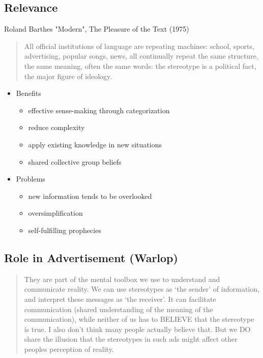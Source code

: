 \documentclass[12pt]{article}
\begin{document}
\subsection{Relevance}

Roland Barthes "Modern", The Pleasure of the Text (1975)

\begin{quotation} 
 All official institutions of language are repeating machines: school, sports, advertising, popular songs, news, all continually repeat the same structure, the same meaning, often the same words: the stereotype is a political fact, the major figure of ideology.\\
\end{quotation}

\begin{itemize}
\item Benefits
 \begin{itemize}
  \item effective sense-making through categorization
  \item reduce complexity
  \item apply existing knowledge in new situations
  \item shared collective group beliefs
 \end{itemize}
\item Problems
 \begin{itemize}
  \item new information tends to be overlooked
  \item oversimplification
  \item self-fulfilling prophecies
 \end{itemize}
\end{itemize}

\subsection{Role in Advertisement (Warlop)}

\begin{quotation}
They are part of the mental toolbox we use to understand and communicate reality. We can use stereotypes as `the sender' of information, and interpret these messages as `the receiver'.  It can facilitate communication (shared understanding of the meaning of the communication), while neither of us has to BELIEVE that the stereotype is true. I also don't think many people actually believe that. But we DO share the illusion that the stereotypes in such ads might affect other peoples perception of reality.   
\end{quotation}
\end{document}
